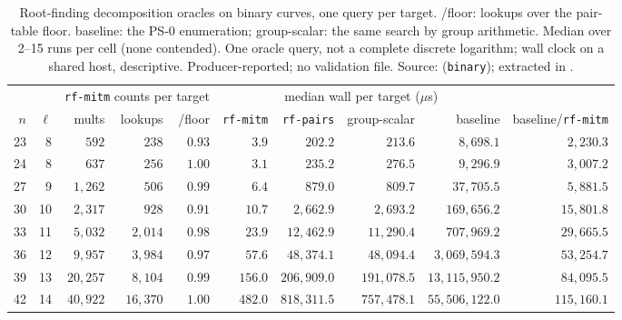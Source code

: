 \begin{table}[t]
\centering\small
\setlength{\tabcolsep}{3.5pt}
\begin{tabular}{@{}rrrrrrrrrr@{}}
\toprule
& & \multicolumn{3}{c}{\texttt{rf-mitm} counts per target} & \multicolumn{4}{c}{median wall per target ($\mu$s)} & \\
\cmidrule(lr){3-5}\cmidrule(lr){6-9}
$n$ & $\ell$ & mults & lookups & /floor & \texttt{rf-mitm} & \texttt{rf-pairs} & group-scalar & baseline & baseline/\texttt{rf-mitm} \\
\midrule
23 & 8 & $592$ & $238$ & $0.93$ & $3.9$ & $202.2$ & $213.6$ & $8{,}698.1$ & $2{,}230.3$ \\
24 & 8 & $637$ & $256$ & $1.00$ & $3.1$ & $235.2$ & $276.5$ & $9{,}296.9$ & $3{,}007.2$ \\
27 & 9 & $1{,}262$ & $506$ & $0.99$ & $6.4$ & $879.0$ & $809.7$ & $37{,}705.5$ & $5{,}881.5$ \\
30 & 10 & $2{,}317$ & $928$ & $0.91$ & $10.7$ & $2{,}662.9$ & $2{,}693.2$ & $169{,}656.2$ & $15{,}801.8$ \\
33 & 11 & $5{,}032$ & $2{,}014$ & $0.98$ & $23.9$ & $12{,}462.9$ & $11{,}290.4$ & $707{,}969.2$ & $29{,}665.5$ \\
36 & 12 & $9{,}957$ & $3{,}984$ & $0.97$ & $57.6$ & $48{,}374.1$ & $48{,}094.4$ & $3{,}069{,}594.3$ & $53{,}254.7$ \\
39 & 13 & $20{,}257$ & $8{,}104$ & $0.99$ & $156.0$ & $206{,}909.0$ & $191{,}078.5$ & $13{,}115{,}950.2$ & $84{,}095.5$ \\
42 & 14 & $40{,}922$ & $16{,}370$ & $1.00$ & $482.0$ & $818{,}311.5$ & $757{,}478.1$ & $55{,}506{,}122.0$ & $115{,}160.1$ \\
\bottomrule
\end{tabular}
\caption[]{Root-finding decomposition oracles on binary curves, one
query per target. /floor: lookups over the pair-table floor. baseline:
the PS-0 enumeration; group-scalar: the same search by group arithmetic.
Median over 2--15 runs per cell (none contended). One oracle query, not a
complete discrete logarithm; wall clock on a shared host, descriptive.
Producer-reported; no validation file. Source:
 (\texttt{binary});
extracted in .}
\label{tab:pf-rf-binary}
\end{table}

